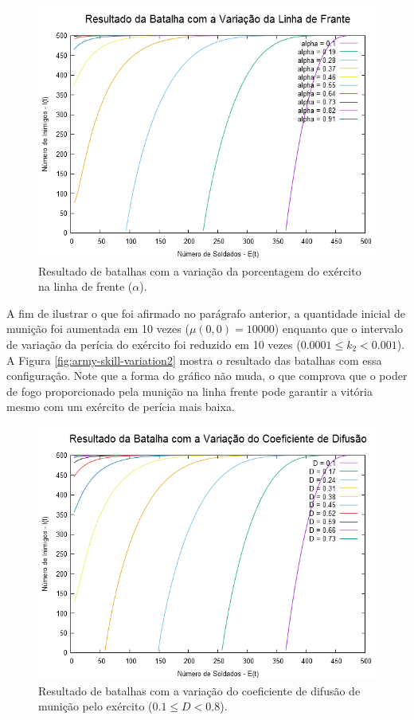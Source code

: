 \documentclass{article}
\begin{document}
\begin{figure}[ht]
	\centering
	\includegraphics[scale=0.35]{figs/battle_front_line_variation.png}
	\caption{Resultado de batalhas com a variação da porcentagem do exército na linha de frente ($\alpha$).}
	\label{fig:front-line-size-variation}
\end{figure}

A fim de ilustrar o que foi afirmado no parágrafo anterior, a quantidade inicial de munição foi aumentada em 10 vezes ($\mu(0,0) = 10000$) enquanto que o intervalo de variação da perícia do exército foi reduzido em 10 vezes ($0.0001 \leq k_2 < 0.001$). A Figura \ref{fig:army-skill-variation2} mostra o resultado das batalhas com essa configuração. Note que a forma do gráfico não muda, o que comprova que o poder de fogo proporcionado pela munição na linha frente pode garantir a vitória mesmo com um exército de perícia mais baixa.

\begin{figure}[ht]
	\centering
	\includegraphics[scale=0.35]{figs/battle_ammo_diffusion_variation.png}
	\caption{Resultado de batalhas com a variação do coeficiente de difusão de munição pelo exército ($0.1 \leq D < 0.8$).}
	\label{fig:ammo-diffusion-variation}
\end{figure}
\end{document}

